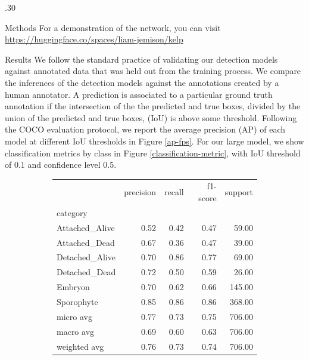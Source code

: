 \documentclass[12pt]{beamer}
\begin{document}
\begin{frame}{}
\begin{columns}[t]
\begin{column}{.30\linewidth}
\begin{block}{Methods}
            For a demonstration of the network, you can visit \url{https://huggingface.co/spaces/liam-jemison/kelp}
        \end{block}
    \begin{block}{Results}
    \vspace{1em}
            We follow the standard practice of validating our detection models against annotated data that was held out from the training process. We compare the inferences of the detection models against the annotations created by a human annotator. A prediction is associated to a particular ground truth annotation if the intersection of the the predicted and true boxes, divided by the union of the predicted and true boxes, (IoU) is above some threshold. Following the COCO evaluation protocol\cite{lin_microsoft_2015}, we report the average precision (AP) of each model at different IoU thresholds in Figure \ref{ap-fps}. 
     For our large model, we show classification metrics by class in Figure \ref{classification-metric}, with IoU threshold of 0.1 and confidence level 0.5. 
     \vspace{1em}
     \begin{figure}
     \begin{subfigure}[b]{0.49\linewidth}
         \begin{tabular}{lrrrr}
            \toprule
            {} &  precision &  recall &  f1-score &  support \\
            category       &            &         &           &          \\
            \midrule
            Attached\_Alive &       0.52 &    0.42 &      0.47 &    59.00 \\
            Attached\_Dead  &       0.67 &    0.36 &      0.47 &    39.00 \\
            Detached\_Alive &       0.70 &    0.86 &      0.77 &    69.00 \\
            Detached\_Dead  &       0.72 &    0.50 &      0.59 &    26.00 \\
            Embryon        &       0.70 &    0.62 &      0.66 &   145.00 \\
            Sporophyte     &       0.85 &    0.86 &      0.86 &   368.00 \\
            micro avg      &       0.77 &    0.73 &      0.75 &   706.00 \\
            macro avg      &       0.69 &    0.60 &      0.63 &   706.00 \\
            weighted avg   &       0.76 &    0.73 &      0.74 &   706.00 \\

\end{tabular}
\end{subfigure}
\end{figure}
\end{block}
\end{column}
\end{columns}
\end{frame}
\end{document}
